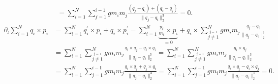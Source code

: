 \begin{solution}
\begin{align*}
    = \sum_{i=1}^N \sum_{j = 1}^{i-1} gm_im_j \frac{(q_j - q_i) + (q_i - q_j)}{\|q_j - q_i\|_2^3} = 0.
  \end{align*}
  \begin{align*}
    \partial_t \sum_{i=1}^N q_i \times p_i &= \sum_{i = 1}^Nq_i^{\prime} \times p_i + q_i \times p_i^{\prime}
    = \sum_{i = 1}^N\underbrace{\frac{p_i}{m_i} \times p_i}_{= 0} + q_i \times \sum_{\stackrel{j = 1}{j \neq 1}}^N gm_im_j \frac{q_j - q_i}{\|q_j - q_i\|_2^3} \\
    &= \sum_{i = 1}^N \sum_{\stackrel{j = 1}{j \neq 1}}^N gm_im_j \frac{q_i \times q_j - q_i \times q_i}{\|q_j - q_i\|_2^3}
    = \sum_{i = 1}^N \sum_{\stackrel{j = 1}{j \neq 1}}^N gm_im_j \frac{q_i \times q_j}{\|q_j - q_i\|_2^3} \\
    &= \sum_{i = 1}^N \sum_{j = 1}^{i-1} gm_im_j \frac{q_i \times q_j + q_j \times q_i}{\|q_j - q_i\|_2^3}
    = \sum_{i = 1}^N \sum_{j = 1}^{i-1} gm_im_j \frac{q_i \times q_j - q_i \times q_j}{\|q_j - q_i\|_2^3} = 0.
  \end{align*}
\end{solution}
